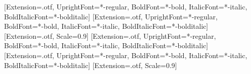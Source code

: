 \ifELrtl
  [Extension=.otf, UprightFont=*-regular, BoldFont=*-bold,
    ItalicFont=*-italic, BoldItalicFont=*-bolditalic]
  [Extension=.otf, UprightFont=*-regular, BoldFont=*-bold,
    ItalicFont=*-italic, BoldItalicFont=*-bolditalic]
  [Extension=.otf, Scale=0.9]
\else
  \setmainfont{texgyretermes}[Extension=.otf, UprightFont=*-regular, BoldFont=*-bold,
    ItalicFont=*-italic, BoldItalicFont=*-bolditalic]
  \setsansfont{texgyreheros}[Extension=.otf, UprightFont=*-regular, BoldFont=*-bold,
    ItalicFont=*-italic, BoldItalicFont=*-bolditalic]
  \setmonofont{lmmono10-regular}[Extension=.otf, Scale=0.9]
\fi
\AtBeginDocument{\let\mathrm\symup \let\mathbf\symbf \let\mathit\symit \let\mathsf\symsfup}
